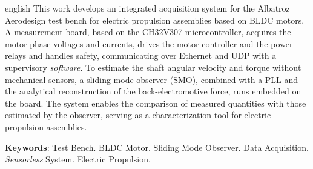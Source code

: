 
\begin{resumo}[Abstract]
 \begin{otherlanguage*}{english}
   This work develops an integrated acquisition system for the Albatroz Aerodesign test bench for electric propulsion assemblies based on BLDC motors. A measurement board, based on the CH32V307 microcontroller, acquires the motor phase voltages and currents, drives the motor controller and the power relays and handles safety, communicating over Ethernet and UDP with a supervisory \textit{software}. To estimate the shaft angular velocity and torque without mechanical sensors, a sliding mode observer (SMO), combined with a PLL and the analytical reconstruction of the back-electromotive force, runs embedded on the board. The system enables the comparison of measured quantities with those estimated by the observer, serving as a characterization tool for electric propulsion assemblies.
   
   \textbf{Keywords}: Test Bench. BLDC Motor. Sliding Mode Observer. Data Acquisition. \textit{Sensorless} System. Electric Propulsion.
 \end{otherlanguage*}
\end{resumo}
